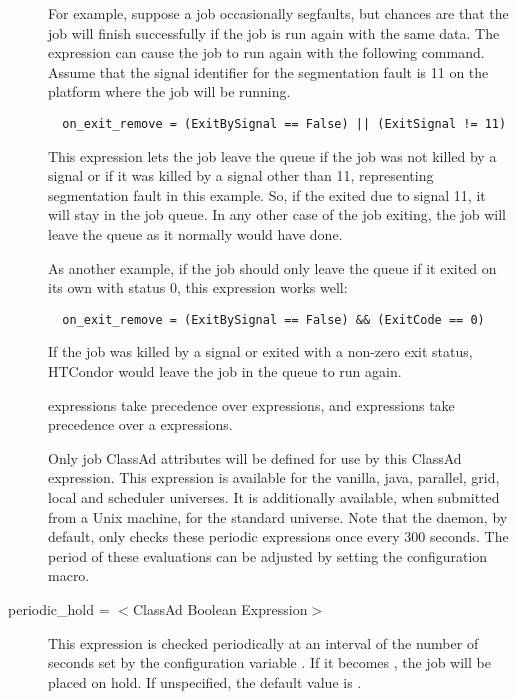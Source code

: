 \begin{description}
For example,
suppose a job occasionally segfaults,
but chances are that the job will finish successfully
if the job is run again with the same data.
The  expression can cause the job
to run again with the following command.
Assume that the signal identifier for the segmentation fault is 11 on the
platform where the job will be running.
\footnotesize
\begin{verbatim}
  on_exit_remove = (ExitBySignal == False) || (ExitSignal != 11)
\end{verbatim}
\normalsize
This expression lets the job leave the queue if the job was
not killed by a signal or if it was
killed by a signal other than 11, representing segmentation fault in
this example.
So, if the exited due to signal 11, it will stay in the job queue.
In any other case of the job exiting,
the job will leave the queue as it normally would have done.

As another example,
if the job should only leave the queue if it exited on its own with
status 0,
this  expression works well:

\footnotesize
\begin{verbatim}
  on_exit_remove = (ExitBySignal == False) && (ExitCode == 0)
\end{verbatim}
\normalsize
If the job was killed by a signal or exited with a non-zero exit
status, HTCondor would leave the job in the queue to run again.

 expressions take
precedence over  expressions,
and  expressions take
precedence over a  expressions.

Only job ClassAd attributes will be defined for use by this ClassAd expression.
This expression is available for the vanilla, java, parallel, grid,
local and scheduler universes.
It is additionally available, when submitted from a Unix machine, for the
standard universe.  Note that the  daemon,
by default, only checks
these periodic expressions once every 300 seconds.  The period of
these evaluations can be adjusted by setting the
 configuration macro.



\label{condor-submit-periodic-hold}
\item[periodic\_hold = $<$ClassAd Boolean Expression$>$]
This expression is checked periodically at an interval of
the number of seconds set by
the configuration variable .
If it becomes , the job will be placed on hold.
If unspecified, the default value is .


\end{description}
